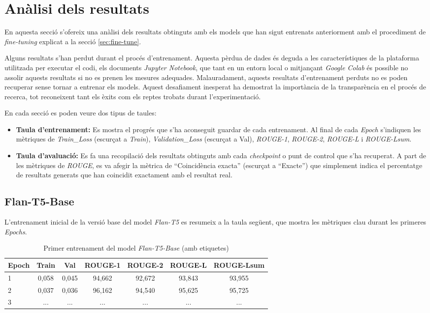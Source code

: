 \section{Anàlisi dels resultats}
En aquesta secció s'ofereix una anàlisi dels resultats obtinguts amb els models que han sigut entrenats anteriorment amb el procediment de \textit{fine-tuning} explicat a la secció \ref{sec:fine-tune}.

Alguns resultats s'han perdut durant el procés d'entrenament. Aquesta pèrdua de dades és deguda a les característiques de la plataforma utilitzada per executar el codi, els documents \textit{Jupyter Notebook}, que tant en un entorn local o mitjançant \textit{Google Colab} és possible no assolir aquests resultats si no es prenen les mesures adequades. Malauradament, aquests resultats d'entrenament perduts no es poden recuperar sense tornar a entrenar els models. Aquest desafiament inesperat ha demostrat la importància de la transparència en el procés de recerca, tot reconeixent tant els èxits com els reptes trobats durant l'experimentació.

En cada secció es poden veure dos tipus de taules:
\begin{itemize}
    \item \textbf{Taula d'entrenament:} Es mostra el progrés que s'ha aconseguit guardar de cada entrenament. Al final de cada \textit{Epoch} s'indiquen les mètriques de \textit{Train\_Loss} (escurçat a \textit{Train}), \textit{Validation\_Loss} (escurçat a Val), \textit{ROUGE-1}, \textit{ROUGE-2}, \textit{ROUGE-L} i \textit{ROUGE-Lsum}.
    \item \textbf{Taula d'avaluació:} Es fa una recopilació dels resultats obtinguts amb cada \textit{checkpoint} o punt de control que s'ha recuperat. A part de les mètriques de \textit{ROUGE}, es va afegir la mètrica de ``Coincidència exacta'' (escurçat a ``Exacte'') que simplement indica el percentatge de resultats generats que han coincidit exactament amb el resultat real.
\end{itemize}

\subsection{Flan-T5-Base}
L'entrenament inicial de la versió base del model \textit{Flan-T5} es resumeix a la taula següent, que mostra les mètriques clau durant les primeres \textit{Epochs}. 

\begin{table}[H]
    \centering
    \begin{tabular}{lcccccc}
    \toprule
    Epoch & Train & Val & ROUGE-1 & ROUGE-2 & ROUGE-L & ROUGE-Lsum \\
    \midrule
    1 & 0,058 & 0,045 & 94,662 & 92,672 & 93,843 & 93,955 \\
    2 & 0,037 & 0,036 & 96,162 & 94,540 & 95,625 & 95,725 \\
    3 & ... & ... & ... & ... & ... & ... \\
    \bottomrule
    \end{tabular}
    \caption[Primer entrenament del model \textit{Flan-T5-Base}]{Primer entrenament del model \textit{Flan-T5-Base} (amb etiquetes)}
\end{table}

